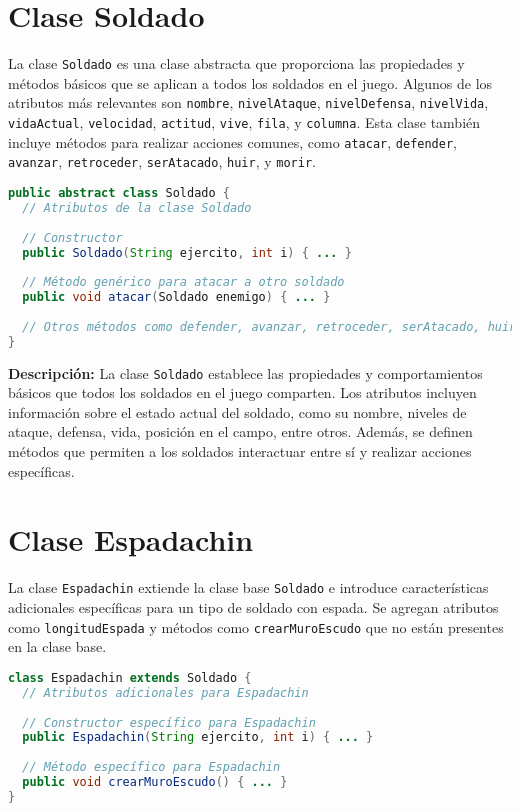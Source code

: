 \section{Clase Soldado}

La clase \texttt{Soldado} es una clase abstracta que proporciona las propiedades y métodos básicos que se aplican a todos los soldados en el juego. Algunos de los atributos más relevantes son \texttt{nombre}, \texttt{nivelAtaque}, \texttt{nivelDefensa}, \texttt{nivelVida}, \texttt{vidaActual}, \texttt{velocidad}, \texttt{actitud}, \texttt{vive}, \texttt{fila}, y \texttt{columna}. Esta clase también incluye métodos para realizar acciones comunes, como \texttt{atacar}, \texttt{defender}, \texttt{avanzar}, \texttt{retroceder}, \texttt{serAtacado}, \texttt{huir}, y \texttt{morir}.

\begin{lstlisting}[language=Java]
public abstract class Soldado {
  // Atributos de la clase Soldado
  
  // Constructor
  public Soldado(String ejercito, int i) { ... }
  
  // Método genérico para atacar a otro soldado
  public void atacar(Soldado enemigo) { ... }
  
  // Otros métodos como defender, avanzar, retroceder, serAtacado, huir, morir, entre otros.
}
\end{lstlisting}

\textbf{Descripción:} La clase \texttt{Soldado} establece las propiedades y comportamientos básicos que todos los soldados en el juego comparten. Los atributos incluyen información sobre el estado actual del soldado, como su nombre, niveles de ataque, defensa, vida, posición en el campo, entre otros. Además, se definen métodos que permiten a los soldados interactuar entre sí y realizar acciones específicas.

\section{Clase Espadachin}

La clase \texttt{Espadachin} extiende la clase base \texttt{Soldado} e introduce características adicionales específicas para un tipo de soldado con espada. Se agregan atributos como \texttt{longitudEspada} y métodos como \texttt{crearMuroEscudo} que no están presentes en la clase base.

\begin{lstlisting}[language=Java]
class Espadachin extends Soldado {
  // Atributos adicionales para Espadachin
  
  // Constructor específico para Espadachin
  public Espadachin(String ejercito, int i) { ... }
  
  // Método específico para Espadachin
  public void crearMuroEscudo() { ... }
}
\end{lstlisting}


